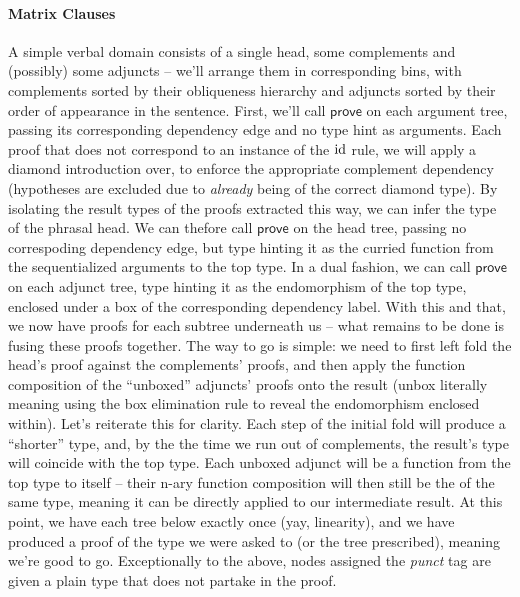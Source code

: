 \paragraph{Matrix Clauses}
A simple verbal domain consists of a single head, some complements and (possibly) some adjuncts  -- we'll arrange them in corresponding bins, with complements sorted by their obliqueness hierarchy and adjuncts sorted by their order of appearance in the sentence.
First, we'll call $\mathsf{prove}$ on each argument tree, passing its corresponding dependency edge and no type hint as arguments.
Each proof that does not correspond to an instance of the $\mathrm{id}$ rule, we will apply a diamond introduction over, to enforce the appropriate complement dependency (hypotheses are excluded due to \textit{already} being of the correct diamond type).
By isolating the result types of the proofs extracted this way, we can infer the type of the phrasal head.
We can thefore call $\mathsf{prove}$ on the head tree, passing no correspoding dependency edge, but type hinting it as the curried function from the sequentialized arguments to the top type.
In a dual fashion, we can call $\mathsf{prove}$ on each adjunct tree, type hinting it as the endomorphism of the top type, enclosed under a box of the corresponding dependency label.
With this and that, we now have proofs for each subtree underneath us -- what remains to be done is fusing these proofs together.
The way to go is simple: we need to first left fold the head's proof against the complements' proofs, and then apply the function composition of the ``unboxed'' adjuncts' proofs onto the result (unbox literally meaning using the box elimination rule to reveal the endomorphism enclosed within).
Let's reiterate this for clarity.
Each step of the initial fold will produce a ``shorter'' type, and, by the the time we run out of complements, the result's type will coincide with the top type.
Each unboxed adjunct will be a function from the top type to itself -- their n-ary function composition will then still be the of the same type, meaning it can be directly applied to our intermediate result.
At this point, we have each tree below exactly once (yay, linearity), and we have produced a proof of the type we were asked to (or the tree prescribed), meaning we're good to go.
Exceptionally to the above, nodes assigned the \textit{punct} tag are given a plain  type that does not partake in the proof.

